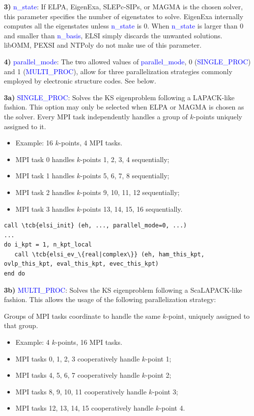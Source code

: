 \documentclass{report}
\newcommand{\tcb}[1]{\textcolor{blue}{#1}}
\begin{document}
\textbf{3)} \tcb{n\_state}: If ELPA, EigenExa, SLEPc-SIPs, or MAGMA is the chosen solver, this parameter specifies the number of eigenstates to solve. EigenExa internally computes all the eigenstates unless \tcb{n\_state} is 0. When \tcb{n\_state} is larger than 0 and smaller than \tcb{n\_basis}, ELSI simply discards the unwanted solutions. libOMM, PEXSI and NTPoly do not make use of this parameter.

\textbf{4)} \tcb{parallel\_mode}: The two allowed values of \tcb{parallel\_mode}, 0 (\tcb{SINGLE\_PROC}) and 1 (\tcb{MULTI\_PROC}), allow for three parallelization strategies commonly employed by electronic structure codes. See below.

\textbf{3a)} \tcb{SINGLE\_PROC}: Solves the KS eigenproblem following a LAPACK-like fashion. This option may only be selected when ELPA or MAGMA is chosen as the solver. Every MPI task independently handles a group of $k$-points uniquely assigned to it.
\begin{itemize}
\item Example: 16 $k$-points, 4 MPI tasks.
\item MPI task 0 handles $k$-points 1, 2, 3, 4 sequentially;
\item MPI task 1 handles $k$-points 5, 6, 7, 8 sequentially;
\item MPI task 2 handles $k$-points 9, 10, 11, 12 sequentially;
\item MPI task 3 handles $k$-points 13, 14, 15, 16 sequentially.
\end{itemize}

\begin{tcolorbox}
\begin{Verbatim}[commandchars=\\\{\}]
call \tcb{elsi_init} (eh, ..., parallel_mode=0, ...)
...
do i_kpt = 1, n_kpt_local
   call \tcb{elsi_ev_\{real|complex\}} (eh, ham_this_kpt, ovlp_this_kpt, eval_this_kpt, evec_this_kpt)
end do
\end{Verbatim}
\end{tcolorbox}

\textbf{3b)} \tcb{MULTI\_PROC}: Solves the KS eigenproblem following a ScaLAPACK-like fashion. This allows the usage of the following parallelization strategy:

Groups of MPI tasks coordinate to handle the same $k$-point, uniquely assigned to that group.
\begin{itemize}
\item Example: 4 $k$-points, 16 MPI tasks.
\item MPI tasks 0, 1, 2, 3 cooperatively handle $k$-point 1;
\item MPI tasks 4, 5, 6, 7 cooperatively handle $k$-point 2;
\item MPI tasks 8, 9, 10, 11 cooperatively handle $k$-point 3;
\item MPI tasks 12, 13, 14, 15 cooperatively handle $k$-point 4.
\end{itemize}
\end{document}
